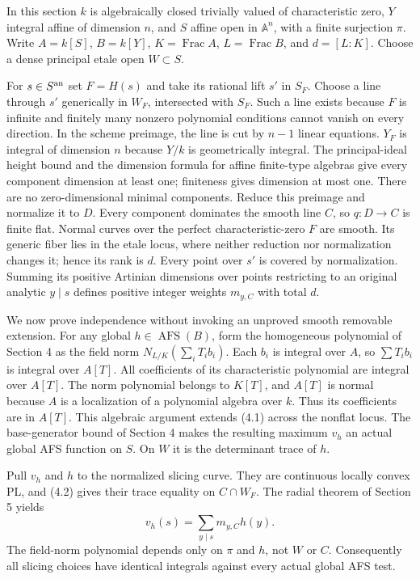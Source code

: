 \documentclass[
  10pt,
]{article}
\begin{document}
In this section \(k\) is algebraically closed trivially valued of
characteristic zero, \(Y\) integral affine of dimension \(n\), and \(S\)
affine open in \(\mathbb A^n\), with a finite surjection \(\pi\). Write
\(A=k[S]\), \(B=k[Y]\), \(K=\operatorname{Frac}A\),
\(L=\operatorname{Frac}B\), and \(d=[L:K]\). Choose a dense principal
etale open \(W\subset S\).

For \(s\in S^{\rm an}\) set \(F=H(s)\) and take its rational lift \(s'\)
in \(S_F\). Choose a line through \(s'\) generically in \(W_F\),
intersected with \(S_F\). Such a line exists because \(F\) is infinite
and finitely many nonzero polynomial conditions cannot vanish on every
direction. In the scheme preimage, the line is cut by \(n-1\) linear
equations. \(Y_F\) is integral of dimension \(n\) because \(Y/k\) is
geometrically integral. The principal-ideal height bound and the
dimension formula for affine finite-type algebras give every component
dimension at least one; finiteness gives dimension at most one. There
are no zero-dimensional minimal components. Reduce this preimage and
normalize it to \(D\). Every component dominates the smooth line \(C\),
so \(q:D\to C\) is finite flat. Normal curves over the perfect
characteristic-zero \(F\) are smooth. Its generic fiber lies in the
etale locus, where neither reduction nor normalization changes it; hence
its rank is \(d\). Every point over \(s'\) is covered by normalization.
Summing its positive Artinian dimensions over points restricting to an
original analytic \(y\mid s\) defines positive integer weights
\(m_{y,C}\) with total \(d\).

We now prove independence without invoking an unproved smooth removable
extension. For any global \(h\in\operatorname{AFS}(B)\), form the
homogeneous polynomial of Section 4 as the field norm
\(N_{L/K}(\sum_iT_i b_i)\). Each \(b_i\) is integral over \(A\), so
\(\sum T_i b_i\) is integral over \(A[T]\). All coefficients of its
characteristic polynomial are integral over \(A[T]\). The norm
polynomial belongs to \(K[T]\), and \(A[T]\) is normal because \(A\) is
a localization of a polynomial algebra over \(k\). Thus its coefficients
are in \(A[T]\). This algebraic argument extends (4.1) across the
nonflat locus. The base-generator bound of Section 4 makes the resulting
maximum \(v_h\) an actual global AFS function on \(S\). On \(W\) it is
the determinant trace of \(h\).

Pull \(v_h\) and \(h\) to the normalized slicing curve. They are
continuous locally convex PL, and (4.2) gives their trace equality on
\(C\cap W_F\). The radial theorem of Section 5 yields
\[v_h(s)=\sum_{y\mid s}m_{y,C}h(y).\tag{6.1}\] The field-norm polynomial
depends only on \(\pi\) and \(h\), not \(W\) or \(C\). Consequently all
slicing choices have identical integrals against every actual global AFS
test.
\end{document}
